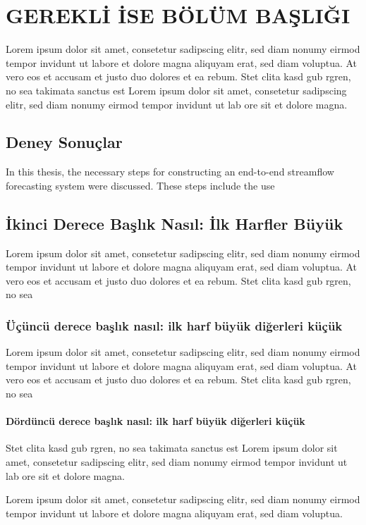 \chapter{GEREKLİ İSE BÖLÜM BAŞLIĞI}
Lorem ipsum dolor sit amet, consetetur sadipscing elitr, sed diam nonumy eirmod tempor invidunt ut labore et dolore magna aliquyam erat, sed diam voluptua. At vero eos et accusam et justo duo dolores et ea rebum. Stet clita kasd gub rgren, no sea takimata sanctus est Lorem ipsum dolor sit amet, consetetur sadipscing elitr, sed diam nonumy eirmod tempor invidunt ut lab ore sit et dolore magna.

\section{Deney Sonuçlar}
In this thesis, the necessary steps for constructing an end-to-end streamflow forecasting system were discussed. These steps include the use

\section{İkinci Derece Başlık Nasıl: İlk Harfler Büyük}
Lorem ipsum dolor sit amet, consetetur sadipscing elitr, sed diam nonumy eirmod tempor invidunt ut labore et dolore magna aliquyam erat, sed diam voluptua. At vero eos et accusam et justo duo dolores et ea rebum. Stet clita kasd gub rgren, no sea

\subsection{Üçüncü derece başlık nasıl: ilk harf büyük diğerleri küçük}
Lorem ipsum dolor sit amet, consetetur sadipscing elitr, sed diam nonumy eirmod tempor invidunt ut labore et dolore magna aliquyam erat, sed diam voluptua. At vero eos et accusam et justo duo dolores et ea rebum. Stet clita kasd gub rgren, no sea

\subsubsection{Dördüncü derece başlık nasıl: ilk harf büyük diğerleri küçük}
Stet clita kasd gub rgren, no sea takimata sanctus est Lorem ipsum dolor sit amet, consetetur sadipscing elitr, sed diam nonumy eirmod tempor invidunt ut lab ore sit et dolore magna.

Lorem ipsum dolor sit amet, consetetur sadipscing elitr, sed diam nonumy eirmod tempor invidunt ut labore et dolore magna aliquyam erat, sed diam voluptua.

